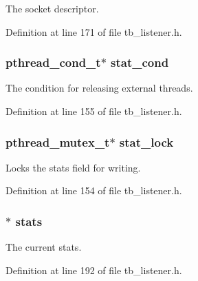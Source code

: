 The socket descriptor. 



Definition at line 171 of file tb\-\_\-listener.\-h.

\hypertarget{structtb__listener__t_a7f764a9f865a1a752a852d4d4422023a}{
\subsubsection[{stat\-\_\-cond}]{\setlength{\rightskip}{0pt plus 5cm}pthread\-\_\-cond\-\_\-t$\ast$ stat\-\_\-cond}}\label{structtb__listener__t_a7f764a9f865a1a752a852d4d4422023a}


The condition for releasing external threads. 



Definition at line 155 of file tb\-\_\-listener.\-h.

\hypertarget{structtb__listener__t_ab828bf6b1b85621025b518a892b79d79}{
\subsubsection[{stat\-\_\-lock}]{\setlength{\rightskip}{0pt plus 5cm}pthread\-\_\-mutex\-\_\-t$\ast$ stat\-\_\-lock}}\label{structtb__listener__t_ab828bf6b1b85621025b518a892b79d79}


Locks the stats field for writing. 



Definition at line 154 of file tb\-\_\-listener.\-h.

\hypertarget{structtb__listener__t_a464593aa6d4c80e0f689c501c4e81e8c}{
\subsubsection[{stats}]{$\ast$ stats}}\label{structtb__listener__t_a464593aa6d4c80e0f689c501c4e81e8c}


The current stats. 



Definition at line 192 of file tb\-\_\-listener.\-h.

